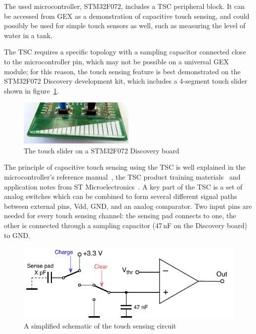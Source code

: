 The used microcontroller, STM32F072, includes a \gls{TSC} peripheral block. It can be accessed from GEX as a demonstration of capacitive touch sensing, and could possibly be used for simple touch sensors as well, such as measuring the level of water in a tank.

The TSC requires a specific topology with a sampling capacitor connected close to the microcontroller pin, which may not be possible on a universal GEX module; for this reason, the touch sensing feature is best demonstrated on the STM32F072 Discovery development kit, which includes a 4-segment touch slider shown in figure~\ref{fig:disco-touch}.

\begin{figure}[h]
	\centering
	\includegraphics[width=0.5\textwidth] {img/disco-touch.jpg}
	\caption{\label{fig:disco-touch}The touch slider on a STM32F072 Discovery board}
\end{figure}

The principle of capacitive touch sensing using the \gls{TSC} is well explained in the microcontroller's reference manual~\cite{f072-rm}, the \gls{TSC} product training materials~\cite{stm-tsc-training, stm-tsc-ppt} and application notes from ST Microelectronics~\cite{stm-tsc-an1, stm-tsc-an2, stm-tsc-an3, stm-tsc-an4}. A key part of the \gls{TSC} is a set of analog switches which can be combined to form several different signal paths between external pins, Vdd, \gls{GND}, and an analog comparator. Two input pins are needed for every touch sensing channel: the sensing pad connects to one, the other is connected through a sampling capacitor  (47\,nF on the Discovery board) to \gls{GND}.

\begin{figure}[h]
	\centering
	\includegraphics[scale=1] {img/tsc-function.pdf}
	\caption{\label{fig:tsc-schem}A simplified schematic of the touch sensing circuit}
\end{figure}

